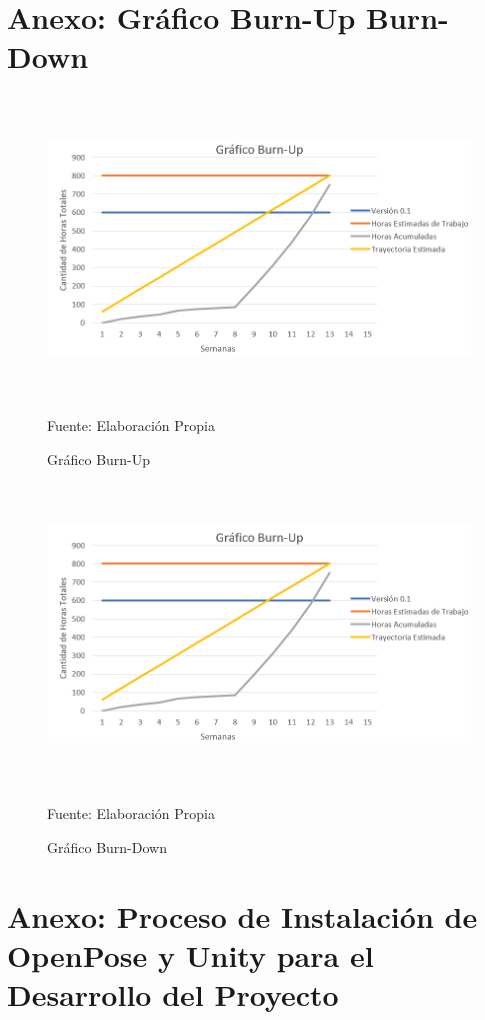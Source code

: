 \clearpage
\section{Anexo: Gráfico Burn-Up Burn-Down}
\begin{figure}[b!]
	\centering
	\includegraphics[width=14cm,height=8cm,]{./Images/graficoburnup.png}
	\caption{Gráfico Burn-Up}
	\footnotesize Fuente: Elaboración Propia
	\label{burnup}
\end{figure}
\begin{figure}[b!]
	\centering
	\includegraphics[width=14cm,height=8cm,]{./Images/graficoburnup.png}
	\caption{Gráfico Burn-Down}
	\footnotesize Fuente: Elaboración Propia
	\label{burndown}
\end{figure}


\newpage
\section{Anexo: Proceso de Instalación de OpenPose y Unity para el Desarrollo del Proyecto}

